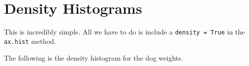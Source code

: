 \documentclass[11pt]{article}
\begin{document}
    \begin{center}
    \end{center}
    { \hspace*{\fill} \\}
    
    \hypertarget{density-histograms}{%
\section{Density Histograms}\label{density-histograms}}

    This is incredibly simple. All we have to do is include a
\texttt{density\ =\ True} in the \texttt{ax.hist} method.

The following is the density histogram for the dog weights.
\end{document}
